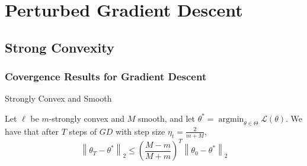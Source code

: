 \documentclass[pdf]{beamer}
\begin{document}
\section{Perturbed Gradient Descent}
\subsection{Strong Convexity}
\begin{frame}
    \frametitle{Covergence Results for Gradient Descent}
    \begin{block}{Strongly Convex and Smooth}
        
         Let $\ell$ be $m$-strongly convex and $M$ smooth, and let $\theta^{*}=\operatorname{argmin}_{\theta \in \Theta} \mathcal{L}(\theta) .$ We have that after $T$ steps of $G D$ with step size $\eta_{t}=\frac{2}{m+M}$,
            $$\left\|\theta_{T}-\theta^{*}\right\|_{2} \leq\left(\frac{M-m}{M+m}\right)^{T}\left\|\theta_{0}-\theta^{*}\right\|_{2}
            $$
    \end{block}

\end{frame}
\end{document}

